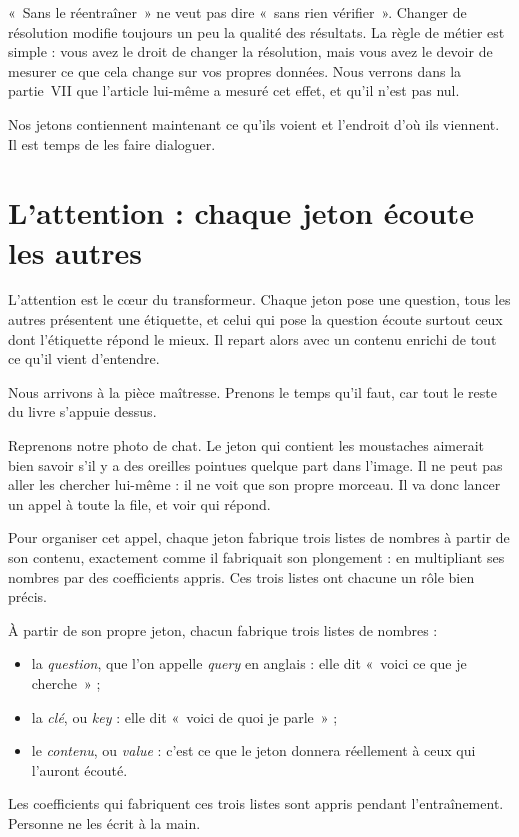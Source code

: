 \begin{piege}
«~Sans le réentraîner~» ne veut pas dire «~sans rien vérifier~». Changer de
résolution modifie toujours un peu la qualité des résultats. La règle de
métier est simple : vous avez le droit de changer la résolution, mais vous
avez le devoir de mesurer ce que cela change sur vos propres données. Nous
verrons dans la partie~VII que l'article lui-même a mesuré cet effet, et
qu'il n'est pas nul.
\end{piege}

Nos jetons contiennent maintenant ce qu'ils voient et l'endroit d'où ils
viennent. Il est temps de les faire dialoguer.

\section{L'attention : chaque jeton écoute les autres}

\begin{enclair}
L'attention est le cœur du transformeur. Chaque jeton pose une question, tous
les autres présentent une étiquette, et celui qui pose la question écoute
surtout ceux dont l'étiquette répond le mieux. Il repart alors avec un
contenu enrichi de tout ce qu'il vient d'entendre.
\end{enclair}

Nous arrivons à la pièce maîtresse. Prenons le temps qu'il faut, car tout le
reste du livre s'appuie dessus.

Reprenons notre photo de chat. Le jeton qui contient les moustaches aimerait
bien savoir s'il y a des oreilles pointues quelque part dans l'image. Il ne
peut pas aller les chercher lui-même : il ne voit que son propre morceau. Il
va donc lancer un appel à toute la file, et voir qui répond.

Pour organiser cet appel, chaque jeton fabrique trois listes de nombres à
partir de son contenu, exactement comme il fabriquait son plongement : en
multipliant ses nombres par des coefficients appris. Ces trois listes ont
chacune un rôle bien précis.

\begin{definition}
À partir de son propre jeton, chacun fabrique trois listes de nombres :

\begin{itemize}
  \item la \emph{question}, que l'on appelle \emph{query} en anglais : elle
        dit «~voici ce que je cherche~» ;
  \item la \emph{clé}, ou \emph{key} : elle dit «~voici de quoi je
        parle~» ;
  \item le \emph{contenu}, ou \emph{value} : c'est ce que le jeton donnera
        réellement à ceux qui l'auront écouté.
\end{itemize}

Les coefficients qui fabriquent ces trois listes sont appris pendant
l'entraînement. Personne ne les écrit à la main.
\end{definition}

